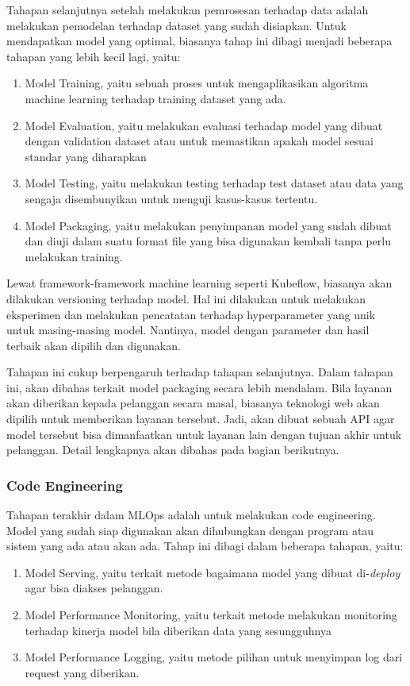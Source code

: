 Tahapan selanjutnya setelah melakukan pemrosesan terhadap data adalah melakukan pemodelan terhadap dataset yang sudah disiapkan.
Untuk mendapatkan model yang optimal, biasanya tahap ini dibagi menjadi beberapa tahapan yang lebih kecil lagi, yaitu:
\begin{enumerate}
  \item Model Training, yaitu sebuah proses untuk mengaplikasikan algoritma machine learning terhadap training dataset yang ada.
  \item Model Evaluation, yaitu melakukan evaluasi terhadap model yang dibuat dengan validation dataset atau untuk memastikan apakah model sesuai standar yang diharapkan
  \item Model Testing, yaitu melakukan testing terhadap test dataset atau data yang sengaja disembunyikan untuk menguji kasus-kasus tertentu.
  \item Model Packaging, yaitu melakukan penyimpanan model yang sudah dibuat dan diuji dalam suatu format file yang bisa digunakan kembali tanpa perlu melakukan training.
\end{enumerate}

Lewat framework-framework machine learning seperti Kubeflow, biasanya akan dilakukan versioning terhadap model.
Hal ini dilakukan untuk melakukan eksperimen dan melakukan pencatatan terhadap hyperparameter yang unik untuk masing-masing model.
Nantinya, model dengan parameter dan hasil terbaik akan dipilih dan digunakan.

Tahapan ini cukup berpengaruh terhadap tahapan selanjutnya.
Dalam tahapan ini, akan dibahas terkait model packaging secara lebih mendalam.
Bila layanan akan diberikan kepada pelanggan secara masal, biasanya teknologi web akan dipilih untuk memberikan layanan tersebut.
Jadi, akan dibuat sebuah API agar model tersebut bisa dimanfaatkan untuk layanan lain dengan tujuan akhir untuk pelanggan. Detail lengkapnya akan dibahas pada bagian berikutnya. 

\subsubsection{Code Engineering}

Tahapan terakhir dalam MLOps adalah untuk melakukan code engineering.
Model yang sudah siap digunakan akan dihubungkan dengan program atau sistem yang ada atau akan ada.
Tahap ini dibagi dalam beberapa tahapan, yaitu:

\begin{enumerate}
  \item Model Serving, yaitu terkait metode bagaimana model yang dibuat di-\textit{deploy} agar bisa diakses pelanggan.
  \item Model Performance Monitoring, yaitu terkait metode melakukan monitoring terhadap kinerja model bila diberikan data yang sesungguhnya
  \item Model Performance Logging, yaitu metode pilihan untuk menyimpan log dari request yang diberikan.
\end{enumerate}

